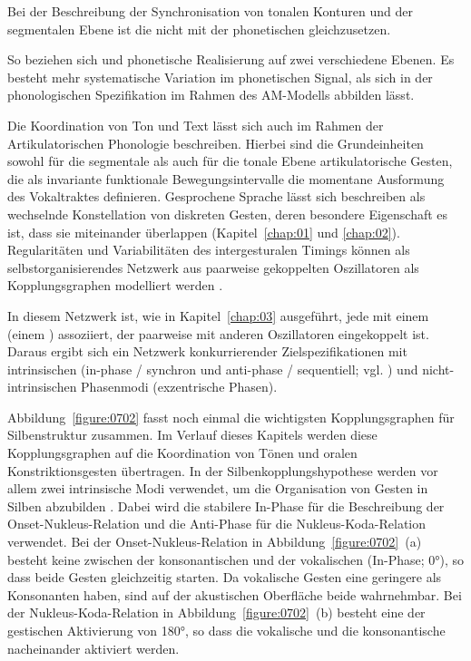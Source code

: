 \newpage
Bei der Beschreibung der Synchronisation von tonalen Konturen und der segmentalen Ebene ist die  nicht mit der phonetischen  gleichzusetzen.

So beziehen sich  und phonetische Realisierung auf zwei verschiedene Ebenen. Es besteht mehr systematische Variation im phonetischen Signal, als sich in der phonologischen Spezifikation im Rahmen des AM-Modells abbilden lässt.

Die Koordination von Ton und Text lässt sich auch im Rahmen der Artikulatorischen Phonologie beschreiben. Hierbei sind die Grundeinheiten sowohl für die segmentale als auch für die tonale Ebene artikulatorische Gesten, die als invariante funktionale Bewegungsintervalle die momentane Ausformung des Vokaltraktes definieren. Gesprochene Sprache lässt sich beschreiben als wechselnde Konstellation von diskreten Gesten, deren besondere Eigenschaft es ist, dass sie miteinander überlappen (Kapitel~\ref{chap:01} und \ref{chap:02}). Regularitäten und Variabilitäten des intergesturalen Timings \citep{Byrd1994,Byrd1996a,Byrd1996b,Cho2001,Bombien2010} können als selbstorganisierendes Netzwerk aus paarweise gekoppelten Oszillatoren als Kopplungsgraphen modelliert werden \citep[u.a.][]{Browman2000, Saltzman2000, Nam2003, Nam2007a, Goldstein2007a, Goldstein2009}.

In diesem Netzwerk ist, wie in Kapitel~\ref{chap:03} ausgeführt, jede  mit einem  (einem ) assoziiert, der paarweise mit anderen Oszillatoren eingekoppelt ist. Daraus ergibt sich ein Netzwerk konkurrierender Zielspezifikationen mit intrinsischen (in-phase / synchron und anti-phase / sequentiell; vgl. \citealt{Turvey1990}) und nicht-intrinsischen Phasenmodi (exzentrische Phasen).

\largerpage
Abbildung~\ref{figure:0702} fasst noch einmal die wichtigsten Kopplungsgraphen für Silbenstruktur zusammen. Im Verlauf dieses Kapitels werden diese Kopplungsgraphen auf die Koordination von Tönen und oralen Konstriktionsgesten übertragen. In der Silbenkopplungshypothese werden vor allem zwei intrinsische Modi verwendet, um die Organisation von Gesten in Silben abzubilden \citep{Goldstein2009, Nam2009b}. Dabei wird die stabilere In-Phase für die Beschreibung der Onset-Nukleus-Relation und die Anti-Phase für die Nukleus-Koda-Relation verwendet. Bei der Onset-Nukleus-Relation in Abbildung~\ref{figure:0702}~(a) besteht keine  zwischen der konsonantischen und der vokalischen  (In-Phase;  0°), so dass beide Gesten gleichzeitig starten. Da vokalische Gesten eine geringere  als Konsonanten haben, sind auf der akustischen Oberfläche beide wahrnehmbar. Bei der Nukleus-Koda-Relation in Abbildung~\ref{figure:0702}~(b) besteht eine  der gestischen Aktivierung von 180°, so dass die vokalische und die konsonantische  nacheinander aktiviert werden.

